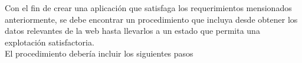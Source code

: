 Con el fin de crear una aplicación que satisfaga los requerimientos mensionados anteriormente, se debe encontrar
un procedimiento que incluya desde obtener los datos relevantes de la web hasta llevarlos a un estado que permita una 
explotación satisfactoria. \\
El procedimiento debería incluir los siguientes pasos \\




